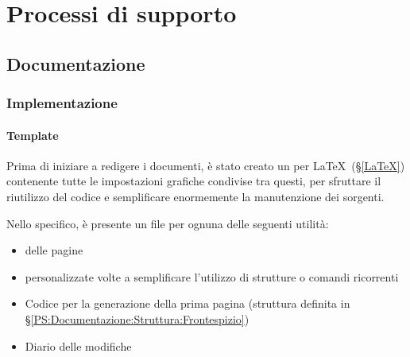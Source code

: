 
\section{Processi di supporto}\label{PS}

	\subsection{Documentazione}\label{PS:Documentazione}

		\subsubsection{Implementazione}\label{PS:Documentazione:Implementazione}

			\paragraph{Template}\label{PS:Documentazione:Implementazione:Template}
			Prima di iniziare a redigere i documenti, è stato creato un  per \LaTeX \ (\S\ref{LaTeX}) contenente tutte le impostazioni grafiche condivise tra questi, per sfruttare il riutilizzo del codice e semplificare enormemente la manutenzione dei sorgenti.\par
			Nello specifico, è presente un file per ognuna delle seguenti utilità:
			\begin{itemize}
				\item {} delle pagine
				\item {} personalizzate volte a semplificare l'utilizzo di strutture o comandi ricorrenti
				\item Codice per la generazione della prima pagina
					(struttura definita in \S\ref{PS:Documentazione:Struttura:Frontespizio})
				\item Diario delle modifiche
			\end{itemize}

